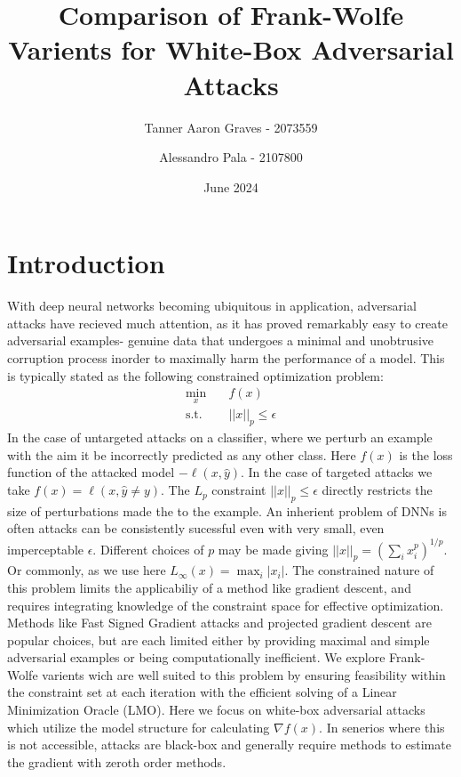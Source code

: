 \documentclass{article}
\title{Comparison of Frank-Wolfe Varients for White-Box Adversarial Attacks}
\author{Tanner Aaron Graves - 2073559\and Alessandro Pala - 2107800}
\date{June 2024}
\begin{document}
\maketitle

\section{Introduction}
With deep neural networks becoming ubiquitous in application, adversarial attacks have recieved much attention, as it has proved remarkably easy to create adversarial examples- genuine data that undergoes a minimal and unobtrusive corruption process inorder to maximally harm the performance of a model. 
This is typically stated as the following constrained optimization problem:
\begin{equation}
\begin{aligned}
\min_x \quad & f(x)\\
\text{s.t.} \quad & ||x||_p \leq \epsilon
\end{aligned}
\end{equation}
In the case of untargeted attacks on a classifier, where we perturb an example with the aim it be incorrectly predicted as any other class. Here $f(x)$ is the loss function of the attacked model $-\ell(x, \hat{y})$. In the case of targeted attacks we take $f(x) = \ell(x, \hat{y}\neq y)$.
The $L_p$ constraint $||x||_p \leq \epsilon$ directly restricts the size of perturbations made the to the example. An inherient problem of DNNs is often attacks can be consistently sucessful even with very small, even imperceptable $\epsilon$. Different choices of $p$ may be made giving $||x||_p = (\sum_i{x_i^p})^{1/p}$. Or commonly, as we use here $L_\infty(x) = \max_i |x_i|$. 
The constrained nature of this problem limits the applicabiliy of a method like gradient descent, and requires integrating knowledge of the constraint space for effective optimization. Methods like Fast Signed Gradient attacks and projected gradient descent are popular choices, but are each limited either by providing maximal and simple adversarial examples or being computationally inefficient. We explore Frank-Wolfe varients wich are well suited to this problem by ensuring feasibility within the constraint set at each iteration with the efficient solving of a Linear Minimization Oracle (LMO). 
Here we focus on white-box adversarial attacks which utilize the model structure for calculating $\nabla f(x)$. In senerios where this is not accessible, attacks are black-box and generally require methods to estimate the gradient with zeroth order methods.
\end{document}
